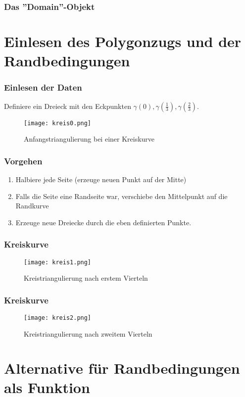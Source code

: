 \documentclass{beamer}
\begin{document}
\begin{frame}[fragile]
	\frametitle{Das ''Domain''-Objekt}
	
\end{frame}



\section{Einlesen des Polygonzugs und der Randbedingungen}

\begin{frame}
	\frametitle{Einlesen der Daten}

	Definiere ein Dreieck mit den Eckpunkten $\gamma(0), \gamma(\frac 13), \gamma(\frac 23)$.
	\begin{figure}
		\caption{Anfangstriangulierung bei einer Kreiskurve}
		\texttt{[image: kreis0.png]}
	\end{figure}
\end{frame}

\begin{frame}
	\frametitle{Vorgehen}

	\begin{enumerate}[1.]
		\item
			Halbiere jede Seite (erzeuge neuen Punkt auf der Mitte)
		\item
			Falls die Seite eine Randseite war, verschiebe den Mittelpunkt auf die Randkurve
		\item
			Erzeuge neue Dreiecke durch die eben definierten Punkte.
	\end{enumerate}
\end{frame}

\begin{frame}
	\frametitle{Kreiskurve}

	\begin{figure}
		\caption{Kreistriangulierung nach erstem Vierteln}
		\texttt{[image: kreis1.png]}
	\end{figure}
\end{frame}

\begin{frame}
	\frametitle{Kreiskurve}

	\begin{figure}
		\caption{Kreistriangulierung nach zweitem Vierteln}
		\texttt{[image: kreis2.png]}
	\end{figure}
\end{frame}


\section{Alternative f\"ur Randbedingungen als Funktion}
\end{document}
